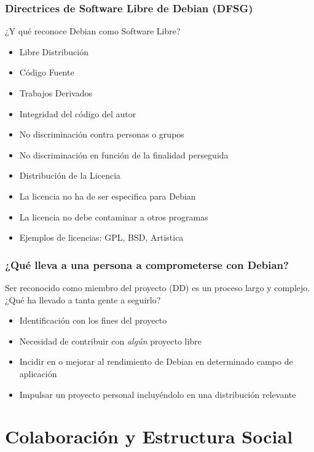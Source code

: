 \documentclass{beamer}
\begin{document}
\begin{frame}
  \frametitle {Directrices de Software Libre de Debian (DFSG)}
  \begin{center}
    ¿Y qué reconoce Debian como Software Libre?
  \end{center}
  \begin{itemize}
    \item Libre Distribución
    \item Código Fuente
    \item Trabajos Derivados
    \item Integridad del código del autor
    \item No discriminación contra personas o grupos
    \item No discriminación en función de la finalidad perseguida
    \item Distribución de la Licencia
    \item La licencia no ha de ser especifica para Debian
    \item La licencia no debe contaminar a otros programas
    \item Ejemplos de licencias: GPL, BSD, Artistica
  \end{itemize}
\end{frame}

\begin{frame}
  \frametitle {¿Qué lleva a una persona a comprometerse con Debian?}
  \begin{center}
    Ser reconocido como miembro del proyecto (DD) es un proceso largo
    y complejo. ¿Qué ha llevado a tanta gente a seguirlo?
  \end{center}
  \begin{itemize}
  \item Identificación con los fines del proyecto
  \item Necesidad de contribuir con {\em algún} proyecto libre
  \item Incidir en o mejorar al rendimiento de Debian en determinado
    campo de aplicación
  \item Impulsar un proyecto personal incluyéndolo en una distribución
    relevante
  \end{itemize}
\end{frame}

\section[Colaboración]{Colaboración y Estructura Social}
\end{document}
